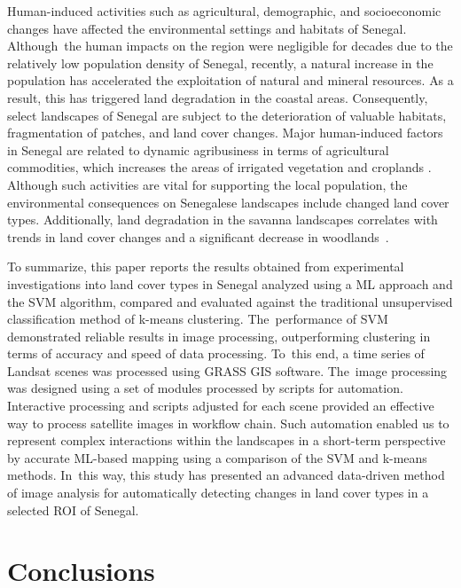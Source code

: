 \documentclass[earth,article,accept,pdftex,moreauthors]{Definitions/mdpi}
\begin{document}
{{Human-induced activities such as agricultural, demographic, and socioeconomic changes have affected {the} environmental settings {and habitats }of Senegal. Although~the {human impacts} on the region were negligible for decades{ }due to the relatively low population density of Senegal, recently, a natural increase in the population{ }has accelerated {the }exploitation of  natural and mineral resources{. }As a result, this has triggered {land} degradation in {the} coastal areas. Consequently, select landscapes of Senegal are subject to the deterioration of valuable habitats, fragmentation of patches, and land cover changes.} Major human-induced {factors in Senegal are related to} dynamic agribusiness in terms of  agricultural commodities, which {increases the }  areas of irrigated vegetation {and croplands} \cite{land8030042}. {Although such }activities are vital for supporting the local population{, }the environmental consequences on Senegalese landscapes include{ }changed land cover types. Additionally, land degradation{ }in the savanna landscapes { }correlates with  trends in land{ }cover changes and a significant decrease in woodlands~\cite{Kalema}.

To summarize, this paper reports the results obtained from experimental investigations into land cover types in Senegal analyzed using a {ML} approach and the {SVM} algorithm, compared and evaluated against the traditional unsupervised classification method of k-means clustering. The~performance of SVM demonstrated reliable results {in image processing, }outperforming clustering in terms of accuracy and speed of data processing. To~this end, {a }time series of{ }Landsat {scenes was} processed using GRASS GIS software. The~image processing was designed using {a set of modules processed by scripts for automation. }Interactive processing and scripts adjusted for each scene provided an effective way to process satellite images {in workflow chain}. Such automation enabled us to represent complex interactions within the landscapes in a short-term perspective{ }by accurate {ML}-based {mapping} {using a comparison of the SVM and k-means methods}. In~this way, this study has presented an advanced data-driven method of image analysis for automatically detecting changes in land cover types in a selected ROI of Senegal{.}

\section{Conclusions}

}
\end{document}
